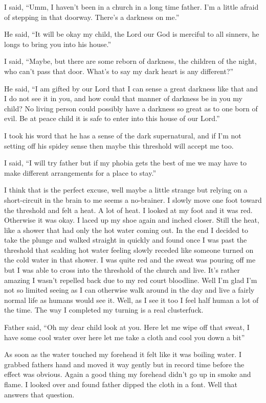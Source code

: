 I said, ``Umm, I haven't been in a church in a long time father. I'm a little afraid of stepping in that doorway. There's a darkness on me.''

He said, ``It will be okay my child, the Lord our God is merciful to all sinners, he longs to bring you into his house.''

I said, ``Maybe, but there are some reborn of darkness, the children of the night, who can't pass that door. What's to say my dark heart is any different?''

He said, ``I am gifted by our Lord that I can sense a great darkness like that and I do not see it in you, and how could that manner of darkness be in you my child? No living person could possibly have a darkness so great as to one born of evil. Be at peace child it is safe to enter into this house of our Lord.''

I took his word that he has a sense of the dark supernatural, and if I'm not setting off his spidey sense then maybe this threshold will accept me too.

I said, ``I will try father but if my phobia gets the best of me we may have to make different arrangements for a place to stay.''

I think that is the perfect excuse, well maybe a little strange but relying on a short-circuit in the brain to me seems a no-brainer. I slowly move one foot toward the threshold and felt a heat. A lot of heat. I looked at my foot and it was red. Otherwise it was okay. I laced up my shoe again and inched closer. Still the heat, like a shower that had only the hot water coming out. In the end I decided to take the plunge and walked straight in quickly and found once I was past the threshold that scalding hot water feeling slowly receded like someone turned on the cold water in that shower. I was quite red and the sweat was pouring off me but I was able to cross into the threshold of the church and live. It's rather amazing I wasn't repelled back due to my red court bloodline. Well I'm glad I'm not so limited seeing as  I can otherwise walk around in the day and live a fairly normal life as humans would see it. Well, as I see it too I feel half human a lot of the time. The way I completed my turning is a real clusterfuck.

Father said, ``Oh my dear child look at you. Here let me wipe off that sweat, I have some cool water over here let me take a cloth and cool you down a bit''

As soon as the water touched my forehead it felt like it was boiling water. I grabbed fathers hand and moved it way gently but in record time before the effect was obvious. Again a good thing my forehead didn't go up in smoke and flame. I looked over and found father dipped the cloth in a font. Well that answers that question.

